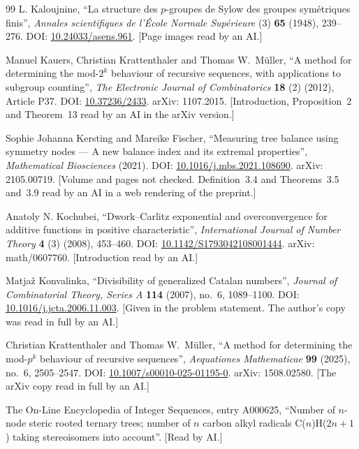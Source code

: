 \documentclass[11pt]{article}
\theoremstyle{definition}
\theoremstyle{remark}
\numberwithin{equation}{section}
\numberwithin{figure}{section}
\begin{document}
\begin{thebibliography}{99}
L. Kaloujnine, ``La structure des $p$-groupes de Sylow des groupes sym\'etriques finis'', \emph{Annales
scientifiques de l'\'Ecole Normale Sup\'erieure} (3) \textbf{65} (1948), 239--276. DOI:
\href{https://doi.org/10.24033/asens.961}{10.24033/asens.961}. [Page images read by an AI.]

Manuel Kauers, Christian Krattenthaler and Thomas W.\ M\"uller, ``A method for determining the mod-$2^k$
behaviour of recursive sequences, with applications to subgroup counting'', \emph{The Electronic Journal of
Combinatorics} \textbf{18} (2) (2012), Article P37. DOI:
\href{https://doi.org/10.37236/2433}{10.37236/2433}. arXiv: 1107.2015. [Introduction, Proposition~2 and
Theorem~13 read by an AI in the arXiv version.]

Sophie Johanna Kersting and Mareike Fischer, ``Measuring tree balance using symmetry nodes --- A new balance
index and its extremal properties'', \emph{Mathematical Biosciences} (2021). DOI:
\href{https://doi.org/10.1016/j.mbs.2021.108690}{10.1016/j.mbs.2021.108690}. arXiv: 2105.00719. [Volume and
pages not checked. Definition~3.4 and Theorems~3.5 and~3.9 read by an AI in a web rendering of the preprint.]

Anatoly N. Kochubei, ``Dwork--Carlitz exponential and overconvergence for additive functions in positive
characteristic'', \emph{International Journal of Number Theory} \textbf{4} (3) (2008), 453--460. DOI:
\href{https://doi.org/10.1142/S1793042108001444}{10.1142/S1793042108001444}. arXiv: math/0607760.
[Introduction read by an AI.]

Matja\v{z} Konvalinka, ``Divisibility of generalized Catalan numbers'', \emph{Journal of Combinatorial Theory,
Series A} \textbf{114} (2007), no.~6, 1089--1100. DOI:
\href{https://doi.org/10.1016/j.jcta.2006.11.003}{10.1016/j.jcta.2006.11.003}. [Given in the problem
statement. The author's copy was read in full by an AI.]

Christian Krattenthaler and Thomas W.\ M\"uller, ``A method for determining the mod-$p^k$ behaviour of
recursive sequences'', \emph{Aequationes Mathematicae} \textbf{99} (2025), no.~6, 2505--2547. DOI:
\href{https://doi.org/10.1007/s00010-025-01195-0}{10.1007/s00010-025-01195-0}. arXiv: 1508.02580. [The arXiv
copy read in full by an AI.]

The On-Line Encyclopedia of Integer Sequences, entry A000625, ``Number of $n$-node steric rooted ternary
trees; number of $n$ carbon alkyl radicals C($n$)H($2n+1$) taking stereoisomers into account''. [Read by AI.]


\end{thebibliography}
\end{document}
